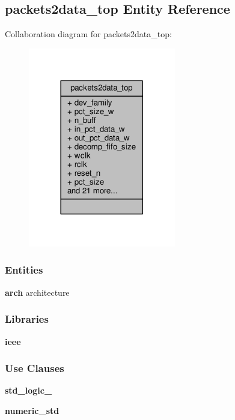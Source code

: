 \subsection{packets2data\+\_\+top Entity Reference}
\label{classpackets2data__top}


Collaboration diagram for packets2data\+\_\+top\+:\nopagebreak
\begin{figure}[H]
\begin{center}
\leavevmode
\includegraphics[width=182pt]{d0/d42/classpackets2data__top__coll__graph}
\end{center}
\end{figure}
\subsubsection*{Entities}
\begin{DoxyCompactItemize}
\item 
{\bf arch} architecture
\end{DoxyCompactItemize}
\subsubsection*{Libraries}
 \begin{DoxyCompactItemize}
\item 
{\bf ieee} 
\end{DoxyCompactItemize}
\subsubsection*{Use Clauses}
 \begin{DoxyCompactItemize}
\item 
{\bf std\+\_\+logic\+\_}   
\item 
{\bf numeric\+\_\+std}   
\end{DoxyCompactItemize}
